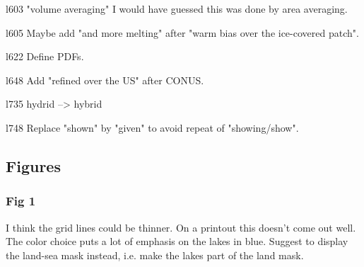 \documentclass[12pt,oneside,a4paper]{article}%
\begin{document}
{\color{blue}{Reworded this slightly to improve the clarity. ``This suggests that coarser models will tend to elevate the ablation zones relative to where they should be, which may be expected to cause anomalous (adiabatic) cooling and depressed melt rates, but this is opposite the melt bias that occurs in the coarse grid simulations."}} \newline

l603 "volume averaging" I would have guessed this was done by area averaging. \newline

{\color{blue}{Fair point. Changed to area averaging.}} \newline

l605 Maybe add "and more melting" after "warm bias over the ice-covered patch". \newline

{\color{blue}{Done.}} \newline

l622 Define PDFs. \newline

{\color{blue}{Done.}} \newline

l648 Add "refined over the US" after CONUS. \newline

{\color{blue}{Done.}} \newline

l735 hydrid --> hybrid \newline

{\color{blue}{Done.}} \newline

l748 Replace "shown" by "given" to avoid repeat of "showing/show". \newline

{\color{blue}{Done.}}

\subsection*{Figures}


\subsubsection*{Fig 1}
I think the grid lines could be thinner. On a printout this doesn't come out well. \newline
The color choice puts a lot of emphasis on the lakes in blue. Suggest to display the land-sea mask instead, i.e. make the lakes part of the land mask. \newline
\end{document}
